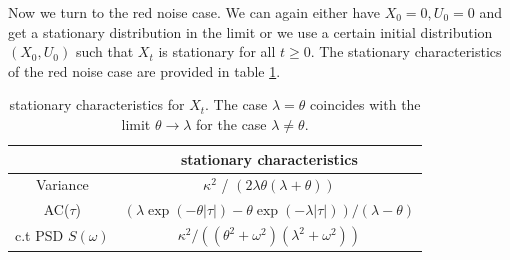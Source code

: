 \documentclass[%
thesis=student,%
coverpage=false,%
titlepage=false,%
headmarks=true, %
english,%
font=libertine, %
math=newpxtx, %
BCOR=5mm,%
coverBCOR=11mm%
]{tumbook}
\begin{document}
Now we turn to the red noise case. We can again either have $X_{0} = 0, U_{0} = 0$ and get a stationary distribution in the limit or we use a certain initial distribution $(X_{0},U_{0})$ such that $X_{t}$ is stationary for all $t \geq 0$. The stationary characteristics of the red noise case are provided in table \ref{tab:red_noise_stat_char}.

\begin{table}[h!]
\centering
\begin{tabular}{|c|c|}
\hline
& stationary characteristics\\
\hline
Variance & $\kappa^2$ / $(2\lambda\theta(\lambda + \theta))$\\
AC($\tau$) & $(\lambda\exp(-\theta\lvert\tau\rvert)-\theta\exp(-\lambda\lvert\tau\rvert))/(\lambda - \theta)$\\
c.t PSD $S(\omega)$ & $\kappa^2/((\theta^2 + \omega^2)(\lambda^2 + \omega^2))$\\
\hline
\end{tabular}
\caption{stationary characteristics for $X_{t}$. The case $\lambda = \theta$ coincides with the limit $\theta \rightarrow \lambda$ for the case $\lambda \neq \theta$.}
\label{tab:red_noise_stat_char}
\end{table}
\end{document}
